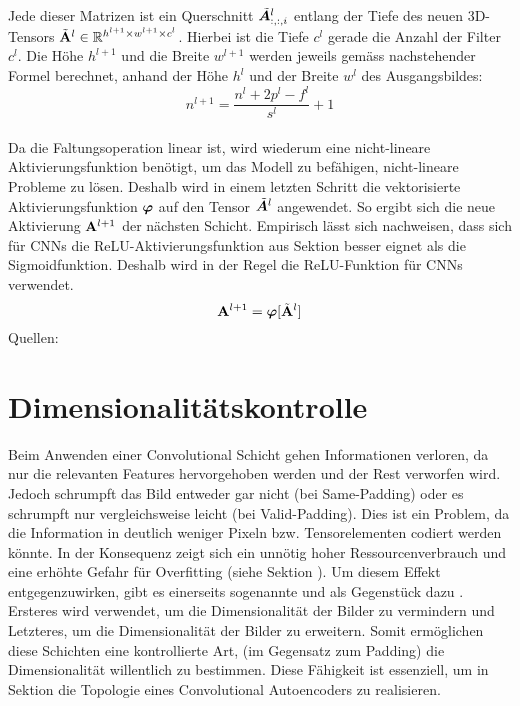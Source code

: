 \\
Jede dieser Matrizen ist ein Querschnitt $\tilde{\bm{A}}^l_{:,:,i}$ entlang der
Tiefe des neuen 3D-Tensors $\tilde{\mathbf{A}}^l \in \mathbb{R}^{h^{l+1} \times w^{l+1} \times c^l}$.
Hierbei ist die Tiefe $c^l$ gerade die Anzahl der Filter $c^l$. Die Höhe
$h^{l+1}$ und die Breite $w^{l+1}$ werden jeweils gemäss nachstehender Formel berechnet,
anhand der Höhe $h^l$ und der Breite $w^l$ des Ausgangsbildes:
\\
\begin{equation}
  n^{l+1} = \frac{n^l + 2p^l - f^l}{s^l} + 1
\end{equation}
\\
Da die Faltungsoperation linear ist, wird wiederum eine
nicht-lineare Aktivierungsfunktion benötigt, um das Modell zu befähigen, nicht-lineare Probleme
zu lösen.
Deshalb wird in einem letzten Schritt die vektorisierte Aktivierungsfunktion
$\bm{\varphi}$ auf den Tensor $\tilde{\bm{A}}^l$ angewendet. So ergibt sich die
neue Aktivierung $\mathbf{A}^{l+1}$ der nächsten Schicht. Empirisch lässt sich nachweisen,
dass sich für CNNs die ReLU-Aktivierungsfunktion aus Sektion  besser eignet als die
Sigmoidfunktion. Deshalb wird in der Regel die ReLU-Funktion für CNNs verwendet.
\begin{equation}
  \mathbf{A}^{l+1} = \bm{\varphi}[\tilde{\mathbf{A}}^l]
\end{equation}
\para{}
Quellen: \cite{wiki:cnn} \cite{deeplearning.ai:cnn} \cite{Goodfellow-et-al-2016} \cite{Nielsen}

\section{Dimensionalitätskontrolle}\label{sec:dimensionalitätskontrolle}
Beim Anwenden einer Convolutional Schicht gehen Informationen verloren, da nur
die relevanten Features hervorgehoben werden und der Rest verworfen wird. Jedoch
schrumpft das Bild entweder gar nicht (bei Same-Padding) oder es schrumpft nur
vergleichsweise leicht (bei Valid-Padding). Dies ist ein Problem, da die Information in
deutlich weniger Pixeln bzw. Tensorelementen codiert werden könnte. In der Konsequenz
zeigt sich ein unnötig hoher Ressourcenverbrauch und eine erhöhte Gefahr für
Overfitting (siehe Sektion ). Um diesem Effekt
entgegenzuwirken, gibt es einerseits sogenannte
 und als Gegenstück dazu
. Ersteres wird verwendet, um die Dimensionalität
der Bilder zu vermindern und Letzteres, um die Dimensionalität der Bilder zu
erweitern. Somit ermöglichen diese Schichten eine kontrollierte Art, (im Gegensatz zum
Padding) die Dimensionalität willentlich zu bestimmen. Diese Fähigkeit ist
essenziell, um in Sektion  die Topologie
eines Convolutional Autoencoders zu realisieren.

